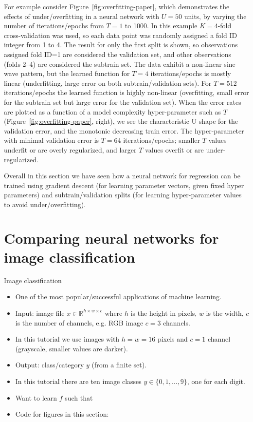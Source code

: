 \documentclass[12pt]{article}
\begin{document}
For example consider Figure~\ref{fig:overfitting-paper}, which
demonstrates the effects of under/overfitting in a neural network with
$U=50$ units, by varying the number of iterations/epochs from $T=1$ to
1000. In this example $K=4$-fold cross-validation was used, so each
data point was randomly assigned a fold ID integer from 1 to 4. The
result for only the first split is shown, so observations assigned
fold ID=1 are considered the validation set, and other observations
(folds 2--4) are considered the subtrain set. The data exhibit a
non-linear sine wave pattern, but the learned function for $T=4$
iterations/epochs is mostly linear (underfitting, large error on both
subtrain/validation sets). For $T=512$ iterations/epochs the learned
function is highly non-linear (overfitting, small error for the
subtrain set but large error for the validation set). When the error
rates are plotted as a function of a model complexity hyper-parameter
such as $T$ (Figure~\ref{fig:overfitting-paper}, right), we see the
characteristic U shape for the validation error, and the monotonic
decreasing train error. The hyper-parameter with minimal validation
error is $T=64$ iterations/epochs; smaller $T$ values underfit or are
overly regularized, and larger $T$ values overfit or are
under-regularized.

Overall in this section we have seen how a neural network for
regression can be trained using gradient descent (for learning
parameter vectors, given fixed hyper parameters) and
subtrain/validation splits (for learning hyper-parameter values to
avoid under/overfitting).

\section{Comparing neural networks for image classification}



{Image classification}
  \begin{itemize}
  \item One of the most popular/successful applications of machine
    learning.
  \item Input: image file $x\in\mathbb R^{h\times w\times c}$ where
    $h$ is the height in pixels, $w$ is the width, $c$ is the number
    of channels, e.g. RGB image $c=3$ channels.
  \item In this tutorial we use images with $h=w=16$ pixels and $c=1$
    channel (grayscale, smaller values are darker).
  \item Output: class/category $y$ (from a finite set).
  \item In this tutorial there are ten image classes $y\in\{0, 1, \dots, 9\}$, one for each
    digit.
  \item Want to learn $f$ such that
  \item Code for figures in this section:
  \end{itemize}
\end{document}
